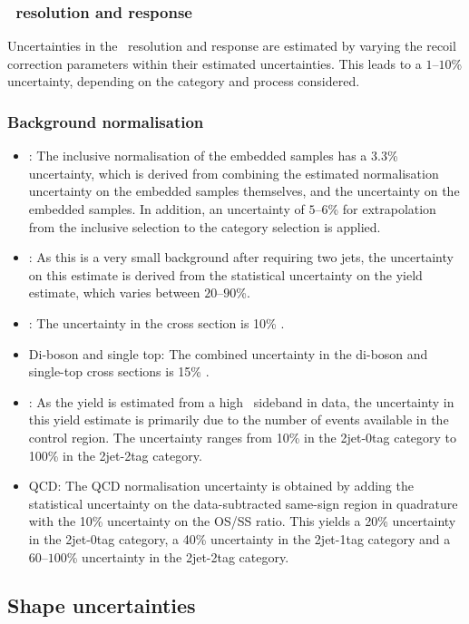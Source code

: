 \subsubsection*{\MET~resolution and response}
Uncertainties in the \MET~resolution and response are estimated by varying
the recoil correction parameters within their estimated uncertainties. This 
leads to a $1$--$10$\% uncertainty, depending on the category and process considered.
\subsubsection*{Background normalisation}
\begin{itemize}
\item \Ztautau : The inclusive normalisation of the embedded samples has a 3.3\% uncertainty, which is derived
from combining the estimated normalisation uncertainty on the embedded samples themselves, and the uncertainty on the \ttbar embedded samples. In addition, an uncertainty of $5$--$6$\% for extrapolation from the inclusive selection to the category selection is applied.
\item \Zellell: As this is a very small background after requiring two jets, the uncertainty on this estimate is derived from the statistical uncertainty on the yield estimate, which varies between $20$--$90$\%.
\item \ttbar: The uncertainty in the \ttbar cross section is 10\% \cite{toppp}.
\item Di-boson and single top: The combined uncertainty in the di-boson and single-top cross sections is 15\% \cite{8TeVdib,8TeVst}.
\item \Wjets: As the \Wjets yield is estimated from a high \mT~sideband in data, the uncertainty in this yield estimate is primarily due to the number of events available in the control region. The uncertainty ranges from 10\% in the 2jet-0tag category to 100\% in the 2jet-2tag category.
\item QCD: The QCD normalisation uncertainty is obtained by adding the statistical uncertainty on the data-subtracted same-sign region in quadrature with the 10\% uncertainty on the OS/SS ratio. This yields a 20\% uncertainty in the 2jet-0tag category, a 40\% uncertainty in the 2jet-1tag category and a $60$--$100$\% uncertainty in the 2jet-2tag category.
\end{itemize}
\subsection{Shape uncertainties}
\label{sec:hhh_uncerts_shape}
